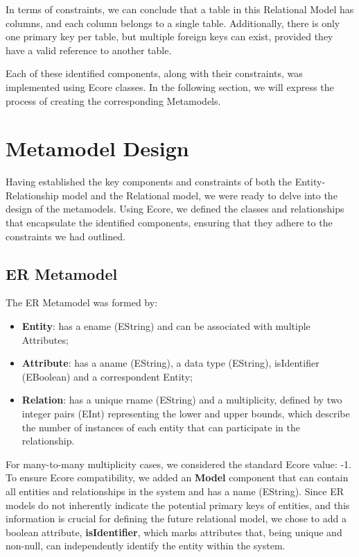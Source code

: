 \documentclass[10pt]{article}
\begin{document}
In terms of constraints, we can conclude that a table in this Relational Model has columns, and each column belongs to a single table. Additionally, there is only one primary key per table, but multiple foreign keys can exist, provided they have a valid reference to another table.

Each of these identified components, along with their constraints, was implemented using Ecore classes. In the following section, we will express the process of creating the corresponding Metamodels.

\section{Metamodel Design}

Having established the key components and constraints of both the Entity-Relationship model and the Relational model, we were ready to delve into the design of the metamodels. Using Ecore, we defined the classes and relationships that encapsulate the identified components, ensuring that they adhere to the constraints we had outlined.

\subsection{ER Metamodel}

The ER Metamodel was formed by:

\begin{itemize}

    \item \textbf{Entity}: has a ename (EString) and can be associated with multiple Attributes;
    
    \item \textbf{Attribute}: has a aname (EString), a data type (EString), isIdentifier (EBoolean) and a correspondent Entity;
    
    \item \textbf{Relation}: has a unique rname (EString) and a multiplicity, defined by two integer pairs (EInt) representing the lower and upper bounds, which describe the number of instances of each entity that can participate in the relationship.
    
\end{itemize}

For many-to-many multiplicity cases, we considered the standard Ecore value: -1. To ensure Ecore compatibility, we added an \textbf{Model} component that can contain all entities and relationships in the system and has a name (EString). Since ER models do not inherently indicate the potential primary keys of entities, and this information is crucial for defining the future relational model, we chose to add a boolean attribute, \textbf{isIdentifier}, which marks attributes that, being unique and non-null, can independently identify the entity within the system.
\end{document}

